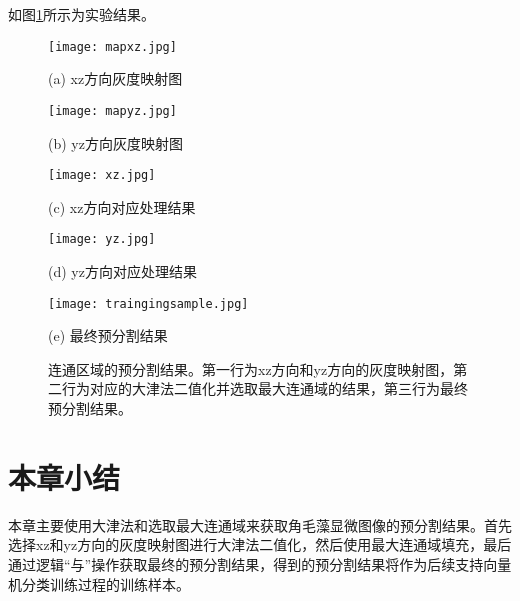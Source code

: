 如图\ref{trainingsampleresult}所示为实验结果。
\begin{figure}[!ht]
\centering
    \begin{minipage}[b]{0.45\linewidth}
    \centering
    \texttt{[image: mapxz.jpg]}
      \centerline{(a) xz方向灰度映射图}\medskip
  \end{minipage}
  \begin{minipage}[b]{0.45\linewidth}
    \centering
    \texttt{[image: mapyz.jpg]}
      \centerline{(b) yz方向灰度映射图}\medskip
  \end{minipage}
   \begin{minipage}[b]{0.45\linewidth}
    \centering
    \texttt{[image: xz.jpg]}
      \centerline{(c) xz方向对应处理结果}\medskip
  \end{minipage}
  \begin{minipage}[b]{0.45\linewidth}
    \centering
    \texttt{[image: yz.jpg]}
      \centerline{(d) yz方向对应处理结果}\medskip
  \end{minipage}
   \begin{minipage}[b]{0.45\linewidth}
    \centering
    \texttt{[image: traingingsample.jpg]}
      \centerline{(e) 最终预分割结果}\medskip
  \end{minipage}
 \caption{连通区域的预分割结果。第一行为xz方向和yz方向的灰度映射图，第二行为对应的大津法二值化并选取最大连通域的结果，第三行为最终预分割结果。}
  \label{trainingsampleresult}
\end{figure}

\section{本章小结}
本章主要使用大津法和选取最大连通域来获取角毛藻显微图像的预分割结果。首先选择xz和yz方向的灰度映射图进行大津法二值化，然后使用最大连通域填充，最后通过逻辑“与”操作获取最终的预分割结果，得到的预分割结果将作为后续支持向量机分类训练过程的训练样本。
